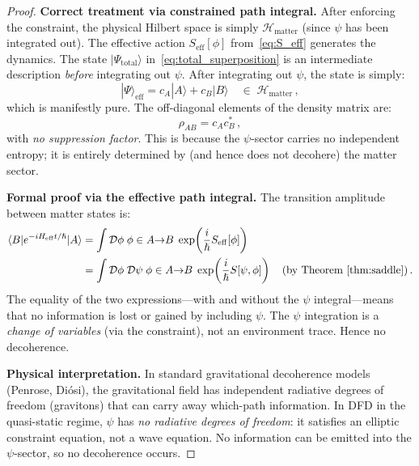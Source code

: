 \documentclass[12pt,a4paper]{article}
\theoremstyle{definition}
\theoremstyle{remark}
\newcommand{\hbar}{\hslash}
\newcommand{\Dpath}{\mathcal{D}}
\newcommand{\Hilb}{\mathcal{H}}
\begin{document}
\begin{proof}
\textbf{Correct treatment via constrained path integral.}
After enforcing the constraint, the physical Hilbert space is simply
$\Hilb_{\mathrm{matter}}$ (since $\psi$ has been integrated out).  The effective
action $S_{\mathrm{eff}}[\phi]$ from~\eqref{eq:S_eff} generates the dynamics.
The state $|\Psi_{\mathrm{total}}\rangle$ in~\eqref{eq:total_superposition} is
an intermediate description \emph{before} integrating out $\psi$.  After integrating
out $\psi$, the state is simply:
\begin{equation}
\label{eq:matter_state}
|\Psi\rangle_{\mathrm{eff}} = c_A|A\rangle + c_B|B\rangle
\quad\in\;\Hilb_{\mathrm{matter}}\,,
\end{equation}
which is manifestly pure.  The off-diagonal elements of the density matrix are:
\begin{equation}
\rho_{AB} = c_A c_B^*\,,
\end{equation}
with \emph{no suppression factor}.  This is because the $\psi$-sector carries
no independent entropy; it is entirely determined by (and hence does not decohere)
the matter sector.

\textbf{Formal proof via the effective path integral.}
The transition amplitude between matter states is:
\begin{align}
\langle B|e^{-iH_{\mathrm{eff}}t/\hbar}|A\rangle
&= \int \Dpath\phi\;\phi \in A{\to}B\;
\exp\!\left(\frac{i}{\hbar}S_{\mathrm{eff}}[\phi]\right) \nonumber\\
&= \int \Dpath\phi\;\Dpath\psi\;\phi \in A{\to}B\;
\exp\!\left(\frac{i}{\hbar}S[\psi,\phi]\right)
\quad\text{(by Theorem~\ref{thm:saddle})}\,.
\end{align}
The equality of the two expressions---with and without the $\psi$ integral---means
that no information is lost or gained by including $\psi$.  The $\psi$
integration is a \emph{change of variables} (via the constraint), not an
environment trace.  Hence no decoherence.

\textbf{Physical interpretation.}  In standard gravitational decoherence models
(Penrose, Di\'osi), the gravitational field has independent radiative degrees
of freedom (gravitons) that can carry away which-path information.  In DFD
in the quasi-static regime, $\psi$ has \emph{no radiative degrees of freedom}:
it satisfies an elliptic constraint equation, not a wave equation.  No
information can be emitted into the $\psi$-sector, so no decoherence occurs.
\end{proof}

\end{document}
